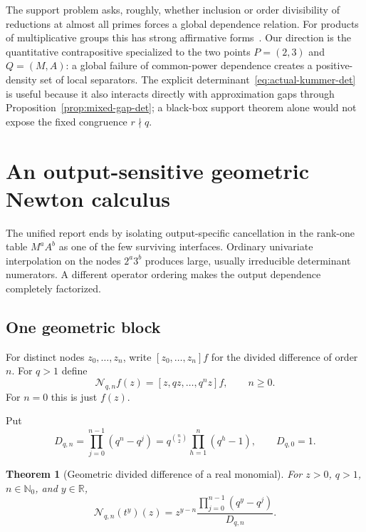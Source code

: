 \documentclass[11pt,oneside]{article}
\newtheorem{theorem}{Theorem}[section]
\theoremstyle{definition}
\theoremstyle{remark}
\newcommand{\Nzero}{\mathbb N_0}
\newcommand{\R}{\mathbb R}
\begin{document}
The support problem asks, roughly, whether inclusion or order divisibility of reductions at
almost all primes forces a global dependence relation.  For products of multiplicative
groups this has strong affirmative forms~\cite{CorralesSchoof,PeruccaSupport}.  Our direction
is the quantitative contrapositive specialized to the two points $P=(2,3)$ and $Q=(M,A)$:
a global failure of common-power dependence creates a positive-density set of local
separators.  The explicit determinant~\eqref{eq:actual-kummer-det} is useful because it also
interacts directly with approximation gaps through
Proposition~\ref{prop:mixed-gap-det}; a black-box support theorem alone would not expose the
fixed congruence $r\nmid q$.

\section{An output-sensitive geometric Newton calculus}
\label{sec:newton}

The unified report ends by isolating output-specific cancellation in the rank-one table
$M^aA^b$ as one of the few surviving interfaces.  Ordinary univariate interpolation on the
nodes $2^a3^b$ produces large, usually irreducible determinant numerators.  A different
operator ordering makes the output dependence completely factorized.

\subsection{One geometric block}

For distinct nodes $z_0,\ldots,z_n$, write
$[z_0,\ldots,z_n]f$ for the divided difference of order $n$.  For $q>1$ define
\begin{equation}
 \mathcal N_{q,n}f(z)=[z,qz,\ldots,q^nz]f,
 \qquad n\ge0.
 \label{eq:geometric-newton-operator}
\end{equation}
For $n=0$ this is just $f(z)$.

Put
\begin{equation}
 D_{q,n}=\prod_{j=0}^{n-1}(q^n-q^j)
 =q^{\binom n2}\prod_{h=1}^n(q^h-1),
 \qquad D_{q,0}=1.
 \label{eq:geometric-vandermonde}
\end{equation}

\begin{theorem}[Geometric divided difference of a real monomial]
\label{thm:one-block}
For $z>0$, $q>1$, $n\in\Nzero$, and $y\in\R$,
\begin{equation}
 \mathcal N_{q,n}(t^y)(z)
 =z^{y-n}
  \frac{\prod_{j=0}^{n-1}(q^y-q^j)}{D_{q,n}}.
 \label{eq:one-block-factorization}
\end{equation}
\end{theorem}
\end{document}
